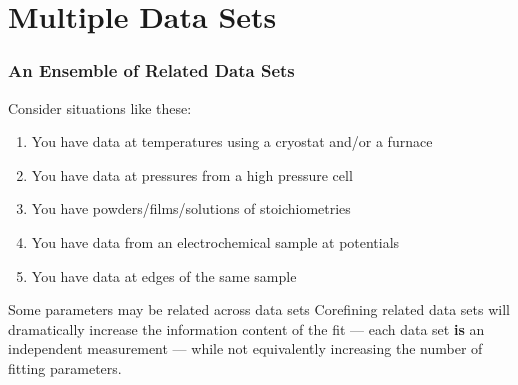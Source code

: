 \documentclass[10pt, xcolor=x11names, compress]{beamer}
\begin{document}
\section[MDS]{Multiple Data Sets}

\begin{frame}
  \frametitle{An Ensemble of Related Data Sets}

  Consider situations like these:
  \begin{enumerate}
  \item You have data at {\multiple} temperatures using a cryostat
    and/or a furnace
  \item You have data at {\multiple} pressures from a high pressure cell
  \item You have powders/films/solutions of {\multiple} stoichiometries
  \item You have data from an electrochemical sample at {\multiple} potentials
  \item You have data at {\multiple} edges of the same sample
  \end{enumerate}

  \bigskip

  \begin{block}{Some parameters may be related across data sets}
    Corefining related data sets will dramatically increase the
    information content of the fit --- each data set \textbf{is} an
    independent measurement --- while not equivalently increasing the
    number of fitting parameters.
  \end{block}
\end{frame}
\end{document}
